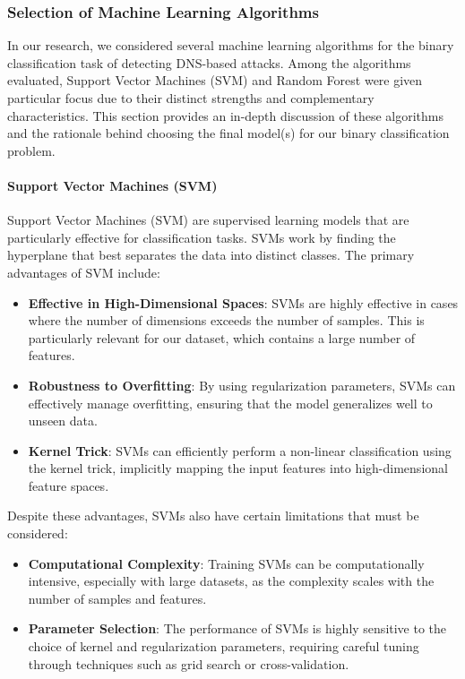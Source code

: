 \subsubsection{Selection of Machine Learning Algorithms}

In our research, we considered several machine learning algorithms for the binary classification task of detecting DNS-based attacks. Among the algorithms evaluated, Support Vector Machines (SVM) and Random Forest were given particular focus due to their distinct strengths and complementary characteristics. This section provides an in-depth discussion of these algorithms and the rationale behind choosing the final model(s) for our binary classification problem.

\paragraph{Support Vector Machines (SVM)}

Support Vector Machines (SVM) are supervised learning models that are particularly effective for classification tasks. SVMs work by finding the hyperplane that best separates the data into distinct classes. The primary advantages of SVM include:

\begin{itemize}
    \item \textbf{Effective in High-Dimensional Spaces}: SVMs are highly effective in cases where the number of dimensions exceeds the number of samples. This is particularly relevant for our dataset, which contains a large number of features.
    \item \textbf{Robustness to Overfitting}: By using regularization parameters, SVMs can effectively manage overfitting, ensuring that the model generalizes well to unseen data.
    \item \textbf{Kernel Trick}: SVMs can efficiently perform a non-linear classification using the kernel trick, implicitly mapping the input features into high-dimensional feature spaces.
\end{itemize}

Despite these advantages, SVMs also have certain limitations that must be considered:
\begin{itemize}
    \item \textbf{Computational Complexity}: Training SVMs can be computationally intensive, especially with large datasets, as the complexity scales with the number of samples and features.
    \item \textbf{Parameter Selection}: The performance of SVMs is highly sensitive to the choice of kernel and regularization parameters, requiring careful tuning through techniques such as grid search or cross-validation.
\end{itemize}


